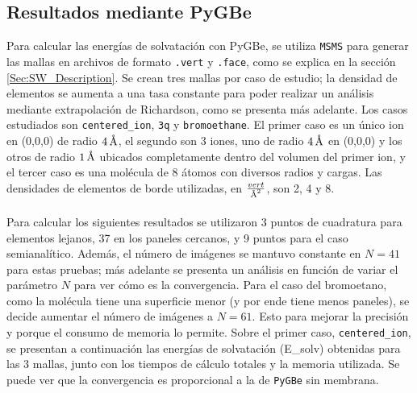 \documentclass[12pt, twoside, onehalfspace, numbers, spanish]{ezthesis}
\numberwithin{equation}{section}
\newcommand{\angstrom}{\text{\normalfont\AA}}
\begin{document}
\subsection{Resultados mediante PyGBe}\label{subsec:resultados_pygbe}
Para calcular las energías de solvatación con PyGBe, se utiliza \texttt{MSMS} para generar las mallas en archivos de formato \texttt{.vert} y \texttt{.face}, como se explica en la sección \ref{Sec:SW_Description}. Se crean tres mallas por caso de estudio; la densidad de elementos se aumenta a una tasa constante para poder realizar un análisis mediante extrapolación de Richardson, como se presenta más adelante. Los casos estudiados son \texttt{centered\_ion}, \texttt{3q} y \texttt{bromoethane}. El primer caso es un único ion en (0,0,0) de radio $4\,\angstrom$, el segundo son 3 iones, uno de radio $4\,\angstrom$ en (0,0,0) y los otros de radio $1\,\angstrom$ ubicados completamente dentro del volumen del primer ion, y el tercer caso es una molécula de 8 átomos con diversos radios y cargas. Las densidades de elementos de borde utilizadas, en $\frac{vert}{\angstrom^2}$, son 2, 4 y 8.\\\\
Para calcular los siguientes resultados se utilizaron 3 puntos de cuadratura para elementos lejanos, 37 en los paneles cercanos, y 9 puntos para el caso semianalítico. Además, el número de imágenes se mantuvo constante en $N=41$ para estas pruebas; más adelante se presenta un análisis en función de variar el parámetro $N$ para ver cómo es la convergencia. Para el caso del bromoetano, como la molécula tiene una superficie menor (y por ende tiene menos paneles), se decide aumentar el número de imágenes a $N=61$. Esto para mejorar la precisión y porque el consumo de memoria lo permite.
Sobre el primer caso, \texttt{centered\_ion}, se presentan a continuación las energías de solvatación (E\_solv) obtenidas para las 3 mallas, junto con los tiempos de cálculo totales y la memoria utilizada. Se puede ver que la convergencia es proporcional a la de \texttt{PyGBe} sin membrana.
\end{document}
